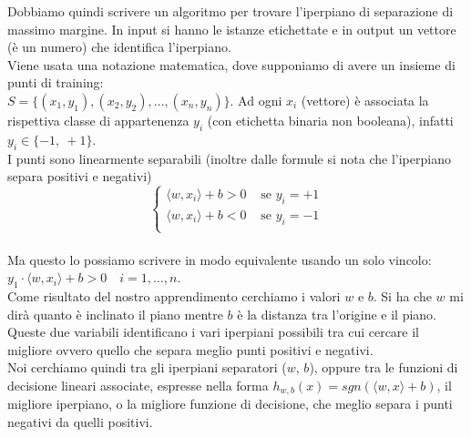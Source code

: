 Dobbiamo quindi scrivere un algoritmo per trovare l'iperpiano di separazione di massimo margine. In input si hanno le istanze etichettate e in output un vettore (è un numero) che identifica l'iperpiano.\\ 
Viene usata una notazione matematica, dove supponiamo di avere un insieme di punti di training: \\ $S = \{(x_1,y_1), (x_2,y_2),\ldots, (x_n,y_n)\}$. Ad ogni $x_i$ (vettore) è associata la rispettiva classe di appartenenza $y_i$ (con etichetta binaria non booleana), infatti $y_i \in \{-1,\ +1\}$.\\
I punti sono linearmente separabili (inoltre dalle formule si nota che l'iperpiano separa positivi e negativi)
\[
  \begin{cases}
    \langle w,x_i\rangle + b >0 &\mbox{ se }y_i=+1\\
    \langle w,x_i\rangle + b <0 &\mbox{ se }y_i=-1\\
  \end{cases}
\] \\
Ma questo lo possiamo scrivere in modo equivalente usando un solo vincolo: $y_1 \cdot \langle w,x_i\rangle + b >0 \quad i= 1,\dots, n$.\\ 
Come risultato del nostro apprendimento cerchiamo i valori $w$ e $b$. Si ha che $w$ mi dirà quanto è inclinato il piano mentre $b$ è la distanza tra l'origine e il piano. Queste due variabili identificano i vari iperpiani possibili tra cui cercare il migliore ovvero quello che separa meglio punti positivi e negativi.\\ 
Noi cerchiamo quindi tra gli iperpiani separatori ($w$, $b$), oppure tra le funzioni di decisione lineari associate, espresse nella forma $h_{w,b}(x) = sgn(\langle w,x \rangle + b)$, il migliore iperpiano, o la migliore funzione di decisione, che meglio separa i punti negativi da quelli positivi. \\

